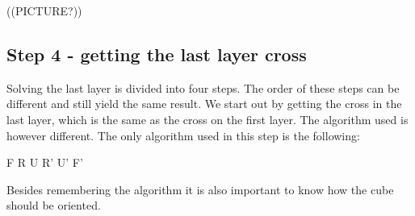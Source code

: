 ((PICTURE?))

\subsection{Step 4 - getting the last layer cross}
Solving the last layer is divided into four steps. The order of these steps can be different and still yield the same result. We start out by getting the cross in the last layer, which is the same as the cross on the first layer. The algorithm used is however different. The only algorithm used in this step is the following:

F R U R' U' F'

Besides remembering the algorithm it is also important to know how the cube should be oriented.